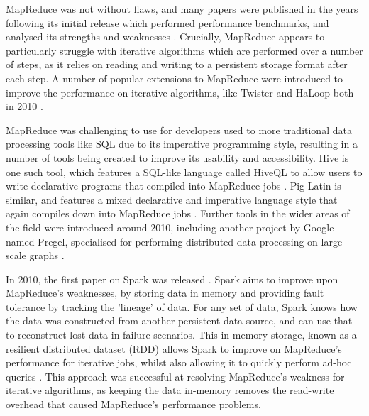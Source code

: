 
MapReduce was not without flaws, and many papers were published in the years following its initial release which performed performance benchmarks, and analysed its strengths and weaknesses \cite{lee2012parallel}. Crucially, MapReduce appears to particularly struggle with iterative algorithms which are performed over a number of steps, as it relies on reading and writing to a persistent storage format after each step. A number of popular extensions to MapReduce were introduced to improve the performance on iterative algorithms, like Twister and HaLoop both in 2010 \cite{ekanayake2010twister, bu2010haloop}.

MapReduce was challenging to use for developers used to more traditional data processing tools like SQL due to its imperative programming style, resulting in a number of tools being created to improve its usability and accessibility. Hive is one such tool, which features a SQL-like language called HiveQL to allow users to write declarative programs that compiled into MapReduce jobs \cite{thusoo2010hive}. Pig Latin is similar, and features a mixed declarative and imperative language style that again compiles down into MapReduce jobs \cite{olston2008pig}. Further tools in the wider areas of the field were introduced around 2010, including another project by Google named Pregel, specialised for performing distributed data processing on large-scale graphs \cite{malewicz2010pregel}.

In 2010, the first paper on Spark was released \cite{zaharia2010spark}. Spark aims to improve upon MapReduce's weaknesses, by storing data in memory and providing fault tolerance by tracking the 'lineage' of data. For any set of data, Spark knows how the data was constructed from another persistent data source, and can use that to reconstruct lost data in failure scenarios. This in-memory storage, known as a resilient distributed dataset (RDD) allows Spark to improve on MapReduce's performance for iterative jobs, whilst also allowing it to quickly perform ad-hoc queries \cite{zaharia2012rdd}. This approach was successful at resolving MapReduce's weakness for iterative algorithms, as keeping the data in-memory removes the read-write overhead that caused MapReduce's performance problems. 

